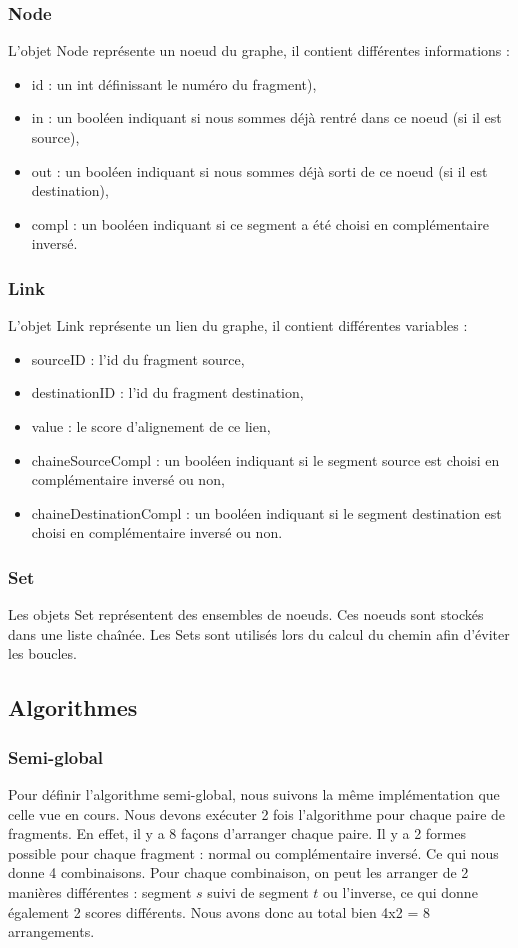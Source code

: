 \documentclass{article}
\begin{document}
\subsubsection{Node}
L'objet Node représente un noeud du graphe, il contient différentes informations :
\begin{itemize}
\item id : un int définissant le numéro du fragment),
\item in : un booléen indiquant si nous sommes déjà rentré dans ce noeud (si il est source),
\item out : un booléen indiquant si nous sommes déjà sorti de ce noeud (si il est destination), 
\item compl : un booléen indiquant si ce segment a été choisi en complémentaire inversé. 
\end{itemize}

\subsubsection{Link} 
L'objet Link représente un lien du graphe, il contient différentes variables :
\begin{itemize}
\item sourceID : l'id du fragment source,
\item destinationID : l'id du fragment destination,
\item value : le score d'alignement de ce lien,
\item chaineSourceCompl : un booléen indiquant si le segment source est choisi en complémentaire inversé ou non,
\item chaineDestinationCompl : un booléen indiquant si le segment destination est choisi en complémentaire inversé ou non.
\end{itemize}

\subsubsection{Set}
Les objets Set représentent des ensembles de noeuds. Ces noeuds sont stockés dans une liste chaînée. Les Sets sont utilisés lors du calcul du chemin afin d'éviter les boucles.

\subsection{Algorithmes}
\subsubsection{Semi-global}
Pour définir l'algorithme semi-global, nous suivons la même implémentation que celle vue en cours. Nous devons exécuter 2 fois l'algorithme pour chaque paire de fragments. En effet, il y a 8 façons d'arranger chaque paire. Il y a 2 formes possible pour chaque fragment : normal ou complémentaire inversé. Ce qui nous donne 4 combinaisons. Pour chaque combinaison, on peut les arranger de 2 manières différentes : segment $s$ suivi de segment $t$ ou l'inverse, ce qui donne également 2 scores différents. Nous avons donc au total bien 4x2 = 8 arrangements. \\ 
\end{document}
